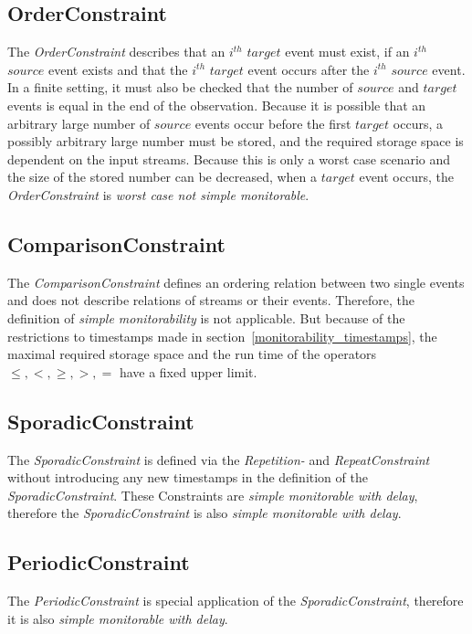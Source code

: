 \subsection{OrderConstraint}
	The \emph{OrderConstraint} describes that an $i^{th}$ $target$ event must exist, if an $i^{th}$ $source$ event exists and that the $i^{th}$ $target$ event occurs after the $i^{th}$ $source$ event. In a finite setting, it must also be checked that the number of $source$ and $target$ events is equal in the end of the observation. Because it is possible that an arbitrary large number of $source$ events occur before the first $target$ occurs, a possibly arbitrary large number must be stored, and the required storage space is dependent on the input streams.  Because this is only a worst case scenario and the size of the stored number can be decreased, when a $target$ event occurs, the \emph{OrderConstraint} is \textit{worst case not simple monitorable}.
	
\subsection{ComparisonConstraint}
	The \textit{ComparisonConstraint} defines an ordering relation between two single events and does not describe relations of streams or their events. Therefore, the definition of \textit{simple monitorability} is not applicable. But because of the restrictions to timestamps made in section~\ref{monitorability_timestamps}, the maximal required storage space and the run time of the operators $\leq, <, \geq, >, =$ have a fixed upper limit.
	
\subsection{SporadicConstraint}
	The \emph{SporadicConstraint} is defined via the \emph{Repetition-} and \emph{RepeatConstraint} without introducing any new timestamps in the definition of the \emph{SporadicConstraint}. These Constraints are \textit{simple monitorable with delay}, therefore the \emph{SporadicConstraint} is also \textit{simple monitorable with delay}.
	
\subsection{PeriodicConstraint}
	The \emph{PeriodicConstraint} is special application of the \emph{SporadicConstraint}, therefore it is also \textit{simple monitorable with delay}.
	
